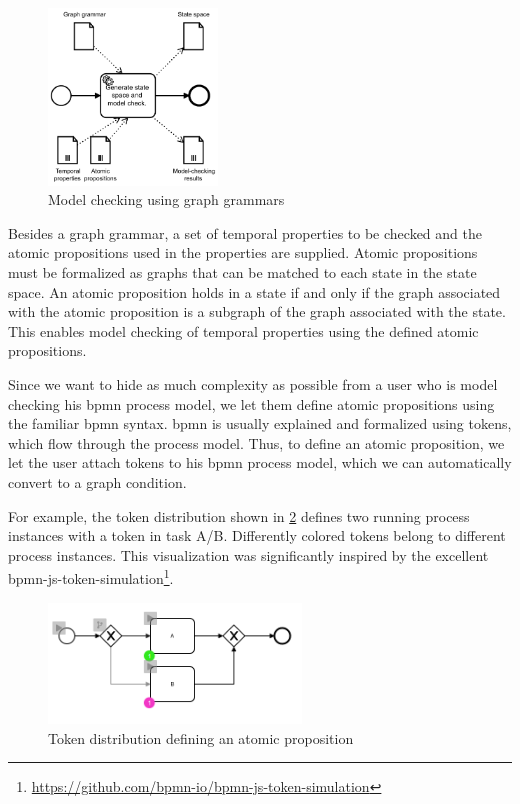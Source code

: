 \documentclass[adraft, copyright, creativecommons]{eptcs} %
\begin{document}
\begin{figure}[h]
    \centering
    \includegraphics[width=0.4\textwidth]{images/approach-second-part.pdf}
    \caption{Model checking using graph grammars}
    \label{fig:modelChecking}
\end{figure}

Besides a graph grammar, a set of temporal properties to be checked and the atomic propositions used in the properties are supplied.
Atomic propositions must be formalized as graphs that can be matched to each state in the state space.
An atomic proposition holds in a state if and only if the graph associated with the atomic proposition is a subgraph of the graph associated with the state. %
This enables model checking of temporal properties using the defined atomic propositions.

Since we want to hide as much complexity as possible from a user who is model checking his \gls*{bpmn} process model, we let them define atomic propositions using the familiar \gls*{bpmn} syntax.
\gls*{bpmn} is usually explained and formalized using tokens, which flow through the process model.
Thus, to define an atomic proposition, we let the user attach tokens to his \gls*{bpmn} process model, which we can automatically convert to a graph condition.

For example, the token distribution shown in \cref{fig:atomicProposition} defines two running process instances with a token in task A/B.
Differently colored tokens belong to different process instances.
This visualization was significantly inspired by the excellent bpmn-js-token-simulation\footnote{\url{https://github.com/bpmn-io/bpmn-js-token-simulation}}.

\begin{figure}[h]
    \centering
    \includegraphics[width=0.6\textwidth]{images/atomicProposition.png}
    \caption{Token distribution defining an atomic proposition}
    \label{fig:atomicProposition}
\end{figure}
\end{document}
